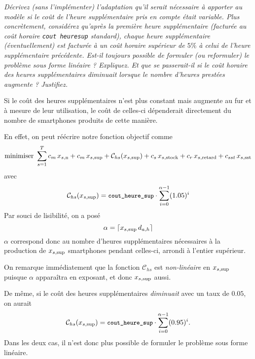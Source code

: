 \question %
\emph{Décrivez (sans l'implémenter) l'adaptation qu'il serait nécessaire à
apporter au modèle si le coût de l'heure supplémentaire pris en compte était
variable. Plus concrètement, considérez qu'après la première heure
supplémentaire (facturée au coût horaire \texttt{cout\textunderscore
heure\textunderscore sup} standard), chaque heure supplémentaire
(éventuellement) est facturée à un coût horaire supérieur de $5 \%$
à celui de l'heure supplémentaire précédente.
Est-il toujours possible de formuler (ou reformuler)
le problème sous forme linéaire ? Expliquez.
Et que se passerait-il si le coût horaire des heures supplémentaires \emph{diminuait}
lorsque le nombre d'heures prestées augmente ? Justifiez.}

Si le coût des heures supplémentaires n'est plus constant mais augmente au fur et à mesure de leur utilisation,
le coût de celles-ci dépenderait directement du nombre de smartphones
produits de cette manière.

En effet, on peut réécrire notre fonction objectif comme
\[
  \mbox{minimiser }
  \sum_{s=1}^{T}
  c_m\, x_{s,\text{n}} + c_m \, x_{s,\text{sup}} + \mathcal{C}_{hs} (x_{s,\text{sup}})
  + c_s\, x_{s,\text{stock}} + c_r\, x_{s,\text{retard}} + c_{sst}\, x_{s,\text{sst}}
\]
avec
\[
  \mathcal{C}_{hs} (x_{s,\text{sup}}) = {\small\texttt{cout\_heure\_sup}} \cdot
  \sum_{i=0}^{\alpha-1}  (1.05)^{i}
\]
Par souci de lisibilité, on a posé
\[ \alpha = \lceil x_{s,\text{sup}} \, d_{a,h} \rceil \]
$\alpha$ correspond donc au nombre d'heures supplémentaires nécessaires à la production de $x_{s,\text{sup}}$ smartphones pendant celles-ci, arrondi à l'entier supérieur.

On remarque immédiatement que la fonction $\mathcal{C}_{hs}$
est \emph{non-linéaire} en $x_{s,\text{sup}}$ puisque $\alpha$ apparaîtra en exposant, et donc $x_{s,\text{sup}}$ aussi.

De même, si le coût des heures supplémentaires \emph{diminuait}
avec un taux de $0.05$,
on aurait
\[
  \mathcal{C}_{hs} (x_{s,\text{sup}}) = {\small\texttt{cout\_heure\_sup}} \cdot
  \sum_{i=0}^{\alpha-1}  (0.95)^{i}.
\]
Dans les deux cas, il n'est donc plus possible de formuler le problème sous forme linéaire.